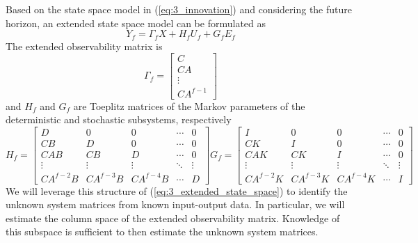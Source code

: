 Based on the state space model in (\ref{eq:3_innovation}) and considering the future horizon, an extended state space model can be formulated as
\begin{equation}\label{eq:3_extended_state_space}
Y_f = \Gamma_f X + H_f U_f + G_f E_f
\end{equation}
The extended observability matrix is
\begin{equation}\label{eq:3_extended_observability}
\Gamma_f = \begin{bmatrix}C\\ CA\\ \vdots\\ CA^{f-1}\end{bmatrix}
\end{equation}
and $H_f$ and $G_f$ are Toeplitz matrices of the Markov parameters of the deterministic and stochastic subsystems, respectively
\begin{subequations}\label{eq:3_toeplitz}
\begin{equation}
H_f = \begin{bmatrix}
D & 0 & 0 & \cdots & 0\\
CB & D & 0 & \cdots & 0\\
CAB & CB & D & \cdots & 0\\
\vdots & \vdots  & \vdots & \ddots & \vdots\\
CA^{f-2}B & CA^{f-3}B & CA^{f-4}B & \cdots & D
\end{bmatrix}
\end{equation}
\begin{equation}
G_f = \begin{bmatrix}
I & 0 & 0 & \cdots & 0\\
CK & I & 0 & \cdots & 0\\
CAK & CK & I & \cdots & 0\\
\vdots & \vdots  & \vdots & \ddots & \vdots\\
CA^{f-2}K & CA^{f-3}K & CA^{f-4}K & \cdots & I
\end{bmatrix}
\end{equation}
\end{subequations}
We will leverage this structure of (\ref{eq:3_extended_state_space}) to identify the unknown system matrices from known input-output data. In particular, we will estimate the column space of the extended observability matrix. Knowledge of this subspace is sufficient to then estimate the unknown system matrices. 


